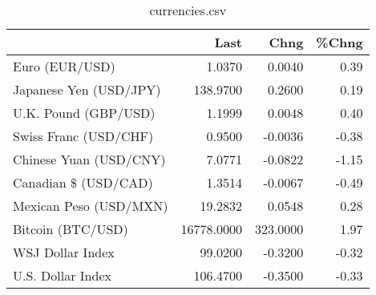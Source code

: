 \documentclass{article}%
\begin{document}
%


\begin{table}[htbp]%
\caption{currencies.csv}%
\centering%
\begin{adjustbox}{width=1\textwidth}%
\begin{tabular}{lrrr}
\toprule
                       &       Last &     Chng &  \%Chng \\
\midrule
        Euro (EUR/USD) &     1.0370 &   0.0040 &   0.39 \\
Japanese Yen (USD/JPY) &   138.9700 &   0.2600 &   0.19 \\
  U.K. Pound (GBP/USD) &     1.1999 &   0.0048 &   0.40 \\
 Swiss Franc (USD/CHF) &     0.9500 &  -0.0036 &  -0.38 \\
Chinese Yuan (USD/CNY) &     7.0771 &  -0.0822 &  -1.15 \\
  Canadian \$ (USD/CAD) &     1.3514 &  -0.0067 &  -0.49 \\
Mexican Peso (USD/MXN) &    19.2832 &   0.0548 &   0.28 \\
     Bitcoin (BTC/USD) & 16778.0000 & 323.0000 &   1.97 \\
      WSJ Dollar Index &    99.0200 &  -0.3200 &  -0.32 \\
     U.S. Dollar Index &   106.4700 &  -0.3500 &  -0.33 \\
\bottomrule
\end{tabular}
%
\end{adjustbox}%
\end{table}

%
\end{document}
